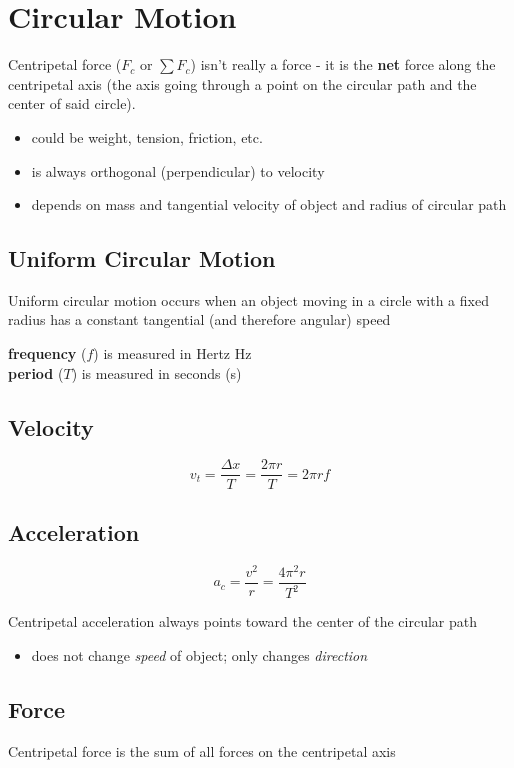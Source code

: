 \documentclass[titlepage]{article}
\begin{document}
\section{Circular Motion}
Centripetal force ($F_c$ or $\sum F_c$) isn't really a force - it is the \textbf{net} force along the centripetal axis (the axis going through a point on the circular path and the center of said circle).
\begin{itemize}
    \item could be weight, tension, friction, etc.
    \item is always orthogonal (perpendicular) to velocity
    \item depends on mass and tangential velocity of object and radius of circular path
\end{itemize}

\subsection{Uniform Circular Motion}
Uniform circular motion occurs when an object moving in a circle with a fixed radius has a constant tangential (and therefore angular) speed

\textbf{frequency} ($f$) is measured in Hertz {Hz}\\
\textbf{period} ($T$) is measured in seconds (s)

\subsection{Velocity}
\[v_t = \frac{\Delta x}{T} = \frac{2\pi r}{T} = 2\pi rf\]

\subsection{Acceleration}
\[a_c = \frac{v^2}{r} = \frac{4 \pi^2 r}{T^2}\]

Centripetal acceleration always points toward the center of the circular path
\begin{itemize}
    \item does not change \emph{speed} of object; only changes \emph{direction}
\end{itemize}

\subsection{Force}
Centripetal force is the sum of all forces on the centripetal axis
\end{document}
